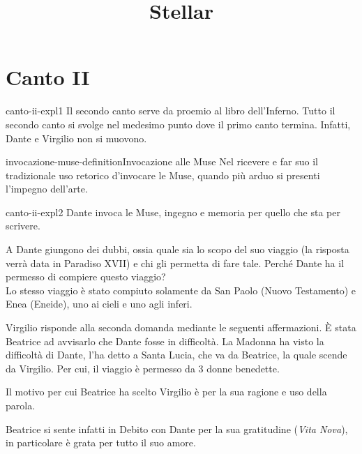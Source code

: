 \documentclass[preview]{standalone}
\begin{document}
\title{Stellar}
\genpage

\section{Canto II}

\begin{snippet}{canto-ii-expl1}
    Il secondo canto serve da proemio al libro dell'Inferno.
    Tutto il secondo canto si svolge nel medesimo punto dove il primo canto termina.
    Infatti, Dante e Virgilio non si muovono.
\end{snippet}

\begin{snippetdefinition}{invocazione-muse-definition}{Invocazione alle Muse}
    Nel ricevere e far suo il tradizionale uso retorico d'invocare le Muse, quando più arduo si presenti l'impegno dell'arte.
\end{snippetdefinition}

\begin{snippet}{canto-ii-expl2}
    Dante invoca le Muse, ingegno e memoria per quello che sta per scrivere.

    A Dante giungono dei dubbi, ossia quale sia lo scopo del suo viaggio
    (la risposta verrà data in Paradiso XVII) e chi gli permetta di fare tale.
    Perché Dante ha il permesso di compiere questo viaggio?
    \\
    Lo stesso viaggio è stato compiuto solamente da San Paolo (Nuovo Testamento)
    e Enea (Eneide), uno ai cieli e uno agli inferi.
    
    Virgilio risponde alla seconda domanda mediante le seguenti affermazioni.
    È stata Beatrice ad avvisarlo che Dante fosse in difficoltà.
    La Madonna ha visto la difficoltà di Dante, l'ha detto a Santa Lucia, che va da Beatrice,
    la quale scende da Virgilio.
    Per cui, il viaggio è permesso da 3 donne benedette.
    \begin{center}
    \end{center}
    Il motivo per cui Beatrice ha scelto Virgilio è per la sua ragione e uso della parola.
    
    Beatrice si sente infatti in Debito con Dante per la sua gratitudine (\textit{Vita Nova}),
    in particolare è grata per tutto il suo amore.
\end{snippet}
\end{document}
